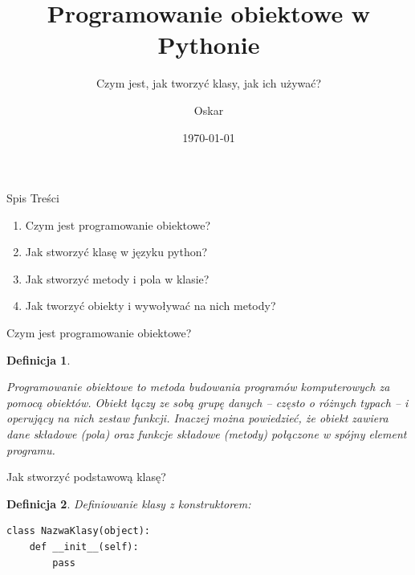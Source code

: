 \documentclass{beamer}
\title{Programowanie obiektowe w Pythonie}
\subtitle{Czym jest, jak tworzyć klasy, jak ich używać?}
\author{Oskar}
\date{\today}
\newtheorem{twierdzenieBlok}{Definicja}
\begin{document}
\begin{frame}
    \titlepage
\end{frame}

\begin{frame}{Spis Treści}
	\begin{Center}
    	    \begin{enumerate}
				\pause
				\item Czym jest programowanie obiektowe?
				\pause
				\item Jak stworzyć klasę w języku python?
				\pause
				\item Jak stworzyć metody i pola w klasie?
				\pause
				\item Jak tworzyć obiekty i wywoływać na nich metody?
	    	\end{enumerate}
	\end{Center}
\end{frame}

\begin{frame}{Czym jest programowanie obiektowe?}
		\pause
    	\begin{twierdzenieBlok}
	    	\begin{Center}
			\footnotesize Programowanie obiektowe to metoda budowania programów komputerowych za pomocą obiektów. Obiekt łączy ze sobą grupę danych – często o różnych typach – i operujący na nich zestaw funkcji. Inaczej można powiedzieć, że obiekt zawiera dane składowe (pola) oraz funkcje składowe (metody) połączone w spójny element programu.
			\end{Center}
		\end{twierdzenieBlok}
\end{frame}

\begin{frame}[fragile]{Jak stworzyć podstawową klasę?}
	\pause
	\begin{twierdzenieBlok}
		\footnotesize Definiowanie klasy z konstruktorem:
  		\scriptsize
		\begin{verbatim}
class NazwaKlasy(object):
	def __init__(self):
		pass
		\end{verbatim}
	\end{twierdzenieBlok}
\end{frame}
\end{document}
